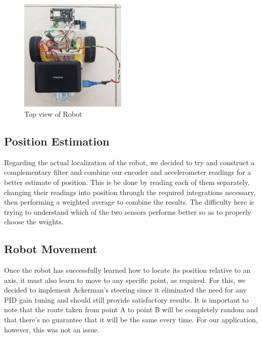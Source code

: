 \documentclass[conference]{IEEEtran}
\begin{document}
    \begin{figure}[H]
        \centering
        \captionsetup{justification=centering}
        \centering
        \includegraphics[width=2in]{9.png}
        \caption{Top view of Robot}  
        \label{6}
    \end{figure}

    \subsection{Position Estimation}

    Regarding the actual localization of the robot, we decided to
    try and construct a complementary filter and combine our encoder and
    accelerometer readings for a better estimate of position. This is
    be done by reading each of them separately, changing their readings
    into position through the required integrations necessary, then performing
    a weighted average to combine the results. The difficulty here
    is trying to understand which of the two sensors performs better so as
    to properly choose the weights.\\

    \subsection{Robot Movement}

    Once the robot has successfully learned how to locate its position
    relative to an axis, it must also learn to move to any specific point,
    as required. For this, we decided to implement Ackerman’s steering since
    it eliminated the need for any PID gain tuning and should still provide
    satisfactory results. It is important to note that the route taken from
    point A to point B will be completely random and that there’s no guarantee
    that it will be the same every time. For our application, however, this
    was not an issue.\\
\end{document}
